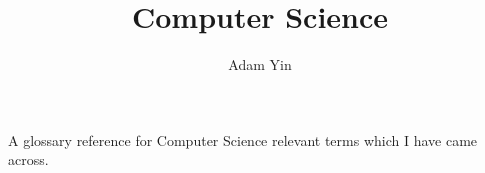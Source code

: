 \documentclass[a4paper]{article}
\title{Computer Science}
\author{Adam Yin}
\date{}
\begin{document}
\maketitle
A glossary reference for Computer Science relevant terms which I have
came across.

\clearpage

\glsaddall
{}
\printglossaries
\end{document}
